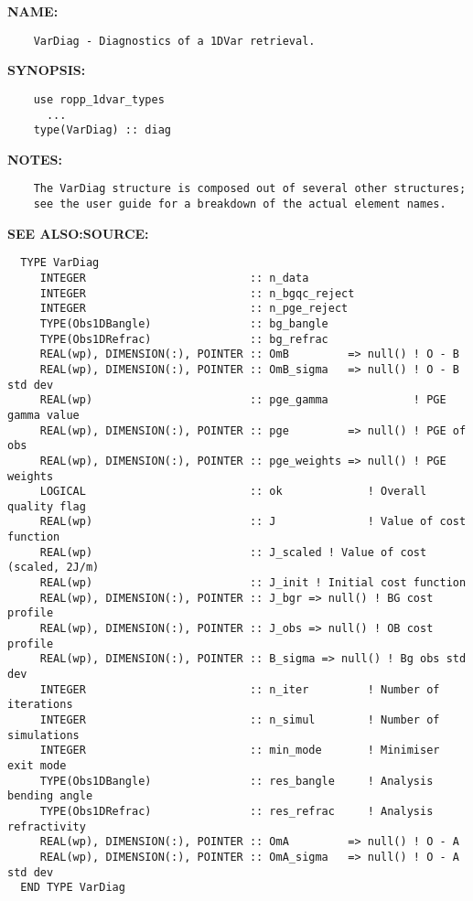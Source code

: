 \label{ch:robo10}
\label{ch:Datatypes_VarDiag}
\textbf{NAME:}\hspace{0.08in}\begin{Verbatim}
    VarDiag - Diagnostics of a 1DVar retrieval.
\end{Verbatim}
\textbf{SYNOPSIS:}\hspace{0.08in}\begin{Verbatim}
    use ropp_1dvar_types
      ...
    type(VarDiag) :: diag
\end{Verbatim}
\textbf{NOTES:}\hspace{0.08in}\begin{Verbatim}
    The VarDiag structure is composed out of several other structures; 
    see the user guide for a breakdown of the actual element names.
\end{Verbatim}
\textbf{SEE ALSO:}\hspace{0.08in}\textbf{SOURCE:}\hspace{0.08in}\begin{Verbatim}
  TYPE VarDiag
     INTEGER                         :: n_data
     INTEGER                         :: n_bgqc_reject
     INTEGER                         :: n_pge_reject
     TYPE(Obs1DBangle)               :: bg_bangle
     TYPE(Obs1DRefrac)               :: bg_refrac
     REAL(wp), DIMENSION(:), POINTER :: OmB         => null() ! O - B
     REAL(wp), DIMENSION(:), POINTER :: OmB_sigma   => null() ! O - B std dev
     REAL(wp)                        :: pge_gamma             ! PGE gamma value
     REAL(wp), DIMENSION(:), POINTER :: pge         => null() ! PGE of obs
     REAL(wp), DIMENSION(:), POINTER :: pge_weights => null() ! PGE weights
     LOGICAL                         :: ok             ! Overall quality flag
     REAL(wp)                        :: J              ! Value of cost function
     REAL(wp)                        :: J_scaled ! Value of cost (scaled, 2J/m)
     REAL(wp)                        :: J_init ! Initial cost function
     REAL(wp), DIMENSION(:), POINTER :: J_bgr => null() ! BG cost profile
     REAL(wp), DIMENSION(:), POINTER :: J_obs => null() ! OB cost profile
     REAL(wp), DIMENSION(:), POINTER :: B_sigma => null() ! Bg obs std dev
     INTEGER                         :: n_iter         ! Number of iterations
     INTEGER                         :: n_simul        ! Number of simulations
     INTEGER                         :: min_mode       ! Minimiser exit mode
     TYPE(Obs1DBangle)               :: res_bangle     ! Analysis bending angle
     TYPE(Obs1DRefrac)               :: res_refrac     ! Analysis refractivity
     REAL(wp), DIMENSION(:), POINTER :: OmA         => null() ! O - A
     REAL(wp), DIMENSION(:), POINTER :: OmA_sigma   => null() ! O - A std dev
  END TYPE VarDiag
\end{Verbatim}
